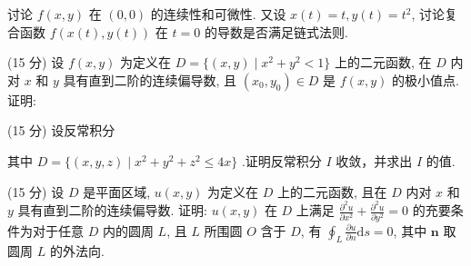 讨论 $f(x,y)$ 在 $(0,0)$ 的连续性和可微性. 又设 $x(t) = t, y(t) = t^2$, 讨论复合函数 $f(x(t),y(t))$ 在 $t = 0$ 的导数是否满足链式法则.\par
\par{}
(15 分) 设 $f(x, y)$ 为定义在 $D = \{(x, y) \mid x^2 + y^2 < 1\}$ 上的二元函数, 在 $D$ 内对 $x$ 和 $y$ 具有直到二阶的连续偏导数, 且 $(x_0, y_0) \in D$ 是 $f(x, y)$ 的极小值点. 证明:\par
\nopagebreak[4]
\par{}
(15 分) 设反常积分\par
\nopagebreak[4]
其中 $D = \{(x,y,z)\mid x^2 +y^2 +z^2\leq 4x\}$ .证明反常积分 $I$ 收敛，并求出 $I$ 的值.\par
(15 分) 设 $D$ 是平面区域, $u(x, y)$ 为定义在 $D$ 上的二元函数, 且在 $D$ 内对 $x$ 和 $y$ 具有直到二阶的连续偏导数. 证明: $u(x, y)$ 在 $D$ 上满足 $\frac{\partial^2 u}{\partial x^2} + \frac{\partial^2 u}{\partial y^2} = 0$ 的充要条件为对于任意 $D$ 内的圆周 $L$, 且 $L$ 所围圆 $O$ 含于 $D$, 有 $\oint_L \frac{\partial u}{\partial n} \mathrm{d}s = 0$, 其中 $\pmb{n}$ 取圆周 $L$ 的外法向.\par
